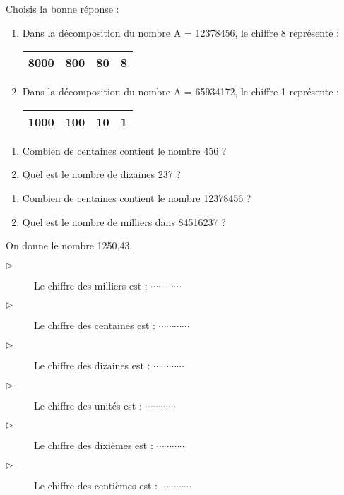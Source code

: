 
Choisis la bonne réponse :
\begin{enumerate}
\item Dans la décomposition du nombre A = 12378456, le chiffre 8 représente :
\begin{tabular}{|c|c|c|c|}
\hline 
8000 & 800 & 80 & 8 \\ 
\hline 
\end{tabular}  

\item Dans la décomposition du nombre A = 65934172, le chiffre 1 représente :
\begin{tabular}{|c|c|c|c|}
\hline 
1000 & 100 & 10 & 1 \\ 
\hline 
\end{tabular} 
\end{enumerate}



\begin{enumerate}
\item Combien de centaines contient le nombre 456 ?
\item Quel est le nombre de dizaines 237 ?
\end{enumerate}


\begin{enumerate}
\item Combien de centaines contient le nombre 12378456 ?
\item Quel est le nombre de milliers dans 84516237 ?
\end{enumerate}



On donne le  nombre 1250,43. 
\begin{description}
\item[$\triangleright$] Le chiffre des milliers est : $ \cdots\cdots\cdots\cdots $
\item[$\triangleright$] Le chiffre des centaines est : $ \cdots\cdots\cdots\cdots $
\item[$\triangleright$] Le chiffre des dizaines est : $ \cdots\cdots\cdots\cdots $
\item[$\triangleright$] Le chiffre des unités est : $ \cdots\cdots\cdots\cdots $
\item[$\triangleright$] Le chiffre des dixièmes est : $ \cdots\cdots\cdots\cdots $
\item[$\triangleright$] Le chiffre des centièmes est : $ \cdots\cdots\cdots\cdots $
\end{description}


